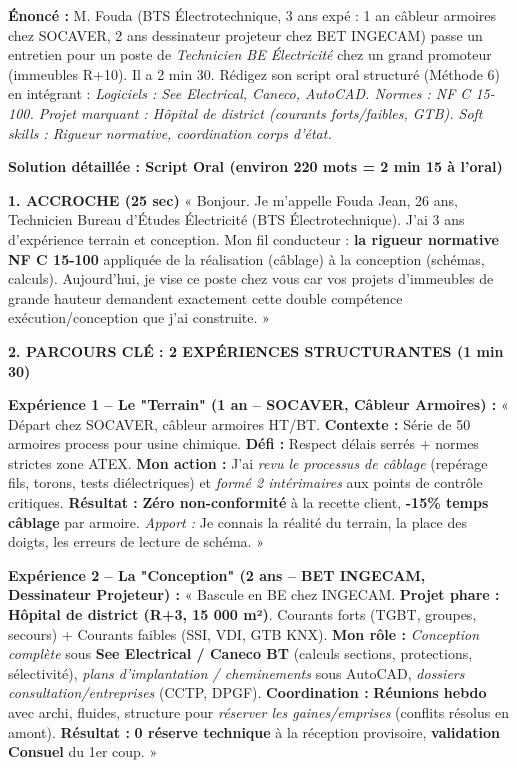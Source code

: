 \documentclass[11pt]{article}
\begin{document}
\begin{exoresolu}
\textbf{Énoncé :} M. Fouda (BTS Électrotechnique, 3 ans expé : 1 an câbleur armoires chez SOCAVER, 2 ans dessinateur projeteur chez BET INGECAM) passe un entretien pour un poste de \emph{Technicien BE Électricité} chez un grand promoteur (immeubles R+10). Il a 2 min 30. Rédigez son script oral structuré (Méthode 6) en intégrant : \emph{Logiciels : See Electrical, Caneco, AutoCAD. Normes : NF C 15-100. Projet marquant : Hôpital de district (courants forts/faibles, GTB). Soft skills : Rigueur normative, coordination corps d'état.}

\tcblower
\textbf{Solution détaillée : Script Oral (environ 220 mots = 2 min 15 à l'oral)}

\textbf{1. ACCROCHE (25 sec)}
« Bonjour. Je m'appelle Fouda Jean, 26 ans, Technicien Bureau d'Études Électricité (BTS Électrotechnique). J'ai 3 ans d'expérience terrain et conception. Mon fil conducteur : \textbf{la rigueur normative NF C 15-100} appliquée de la réalisation (câblage) à la conception (schémas, calculs). Aujourd'hui, je vise ce poste chez vous car vos projets d'immeubles de grande hauteur demandent exactement cette double compétence exécution/conception que j'ai construite. »

\textbf{2. PARCOURS CLÉ : 2 EXPÉRIENCES STRUCTURANTES (1 min 30)}

\textbf{Expérience 1 -- Le "Terrain" (1 an -- SOCAVER, Câbleur Armoires) :}
« Départ chez SOCAVER, câbleur armoires HT/BT. \textbf{Contexte :} Série de 50 armoires process pour usine chimique. \textbf{Défi :} Respect délais serrés + normes strictes zone ATEX. \textbf{Mon action :} J'ai \emph{revu le processus de câblage} (repérage fils, torons, tests diélectriques) et \emph{formé 2 intérimaires} aux points de contrôle critiques. \textbf{Résultat :} \textbf{Zéro non-conformité} à la recette client, \textbf{-15\% temps câblage} par armoire. \emph{Apport :} Je connais la réalité du terrain, la place des doigts, les erreurs de lecture de schéma. »

\textbf{Expérience 2 -- La "Conception" (2 ans -- BET INGECAM, Dessinateur Projeteur) :}
« Bascule en BE chez INGECAM. \textbf{Projet phare :} \textbf{Hôpital de district (R+3, 15 000 m²)}. Courants forts (TGBT, groupes, secours) + Courants faibles (SSI, VDI, GTB KNX). \textbf{Mon rôle :} \emph{Conception complète} sous \textbf{See Electrical / Caneco BT} (calculs sections, protections, sélectivité), \emph{plans d'implantation / cheminements} sous AutoCAD, \emph{dossiers consultation/entreprises} (CCTP, DPGF). \textbf{Coordination :} \textbf{Réunions hebdo} avec archi, fluides, structure pour \emph{réserver les gaines/emprises} (conflits résolus en amont). \textbf{Résultat :} \textbf{0 réserve technique} à la réception provisoire, \textbf{validation Consuel} du 1er coup. »


\end{exoresolu}
\end{document}
